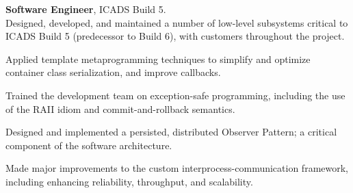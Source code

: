 \documentclass[10pt]{article}
\begin{document}
\begin{itemize}
\begin{item}
\textbf{Software Engineer}, ICADS Build 5.
\\
Designed, developed, and maintained a number of low-level subsystems critical to ICADS Build 5 (predecessor to Build 6), with customers throughout the project.
\begin{itemize}
	  \begin{item}
	    Applied template metaprogramming techniques to simplify and optimize container class serialization, and improve callbacks.
	  \end{item}
	  \begin{item}
	    Trained the development team on exception-safe programming, including the use of the RAII idiom and commit-and-rollback semantics.
	  \end{item}
	  \begin{item}
	    Designed and implemented a persisted, distributed Observer Pattern; a critical component of the software architecture.
	  \end{item}
	  \begin{item}
	    Made major improvements to the custom interprocess-communication framework, including enhancing reliability, throughput, and scalability.
	  \end{item}
\end{itemize}
\end{item}

\end{itemize}
\end{document}
